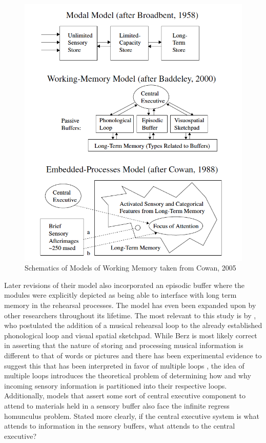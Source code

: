 \documentclass[]{book}
\begin{document}
\begin{figure}

{\centering \includegraphics[width=9.81in]{img/wm_models} 

}

\caption{Schematics of Models of Working Memory taken from Cowan, 2005}\label{fig:wmmodels}
\end{figure}

Later revisions of their model also incorporated an episodic buffer \citep{baddeleyEpisodicBufferNew2000} where the modules were explicitly depicted as being able to interface with long term memory in the rehearsal processes.
The model has even been expanded upon by other researchers throughout its lifetime.
The most relevant to this study is by \citet{berzWorkingMemoryMusic1995}, who postulated the addition of a musical rehearsal loop to the already established phonological loop and visual spatial sketchpad.
While Berz is most likely correct in asserting that the nature of storing and processing musical information is different to that of words or pictures and there has been experimental evidence to suggest this \citep{williamsonMusiciansNonmusiciansShortterm2010} that has been interpreted in favor of multiple loops \citep{wollnerAttentionalFlexibilityMemory2016}, the idea of multiple loops introduces the theoretical problem of determining how and why incoming sensory information is partitioned into their respective loops.
Additionally, models that assert some sort of central executive component to attend to materials held in a sensory buffer also face the infinite regress homunculus problem.
Stated more clearly, if the central executive system is what attends to information in the sensory buffers, what attends to the central executive?
\end{document}
